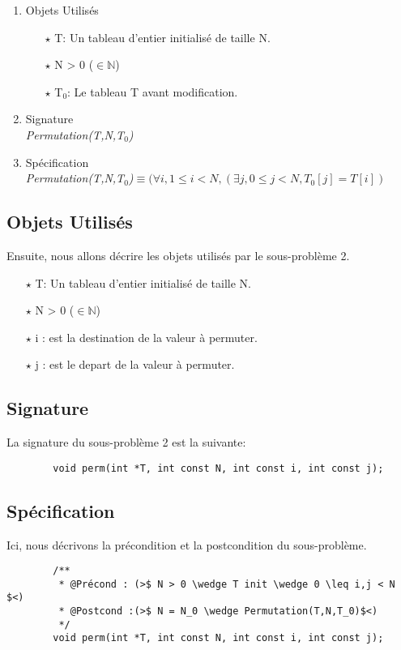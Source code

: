 \documentclass[a4paper, 11pt, oneside]{article}
\begin{document}
        \begin{enumerate}
            \item Objets Utilisés
                \begin{itemize}
                    \item[$\star$] T: Un tableau d'entier initialisé de taille N.
                    \item[$\star$] N > 0 ($\in \mathbb{N}$)
                    \item[$\star$] T$_0$: Le tableau T avant modification.
                \end{itemize}

            \item Signature \\
                \textit{Permutation(T,N,T$_0$)}

            \item Spécification\\
                \textit{Permutation(T,N,T$_0$)}$\equiv (\forall i, 1\leq i < N, (\exists j, 0\leq j < N, T_0[j] = T[i])$
        \end{enumerate}

    \subsection{Objets Utilisés}
        Ensuite, nous allons décrire les objets utilisés par le sous-problème 2.
        \begin{itemize}
            \item[$\star$] T: Un tableau d'entier initialisé de taille N.
            \item[$\star$] N > 0 ($\in \mathbb{N}$)
            \item[$\star$] i : est la destination de la valeur à permuter.
            \item[$\star$] j : est le depart de la valeur à permuter.
        \end{itemize}

    \subsection{Signature}
        La signature du sous-problème 2 est la suivante:
        \begin{lstlisting}
        void perm(int *T, int const N, int const i, int const j);
        \end{lstlisting}
    
    \subsection{Spécification}
        Ici, nous décrivons la précondition et la postcondition du sous-problème.
        \begin{lstlisting}
        /**
         * @Précond : (>$ N > 0 \wedge T init \wedge 0 \leq i,j < N $<)
         * @Postcond :(>$ N = N_0 \wedge Permutation(T,N,T_0)$<)
         */
        void perm(int *T, int const N, int const i, int const j);
        \end{lstlisting}
    
\end{document}
